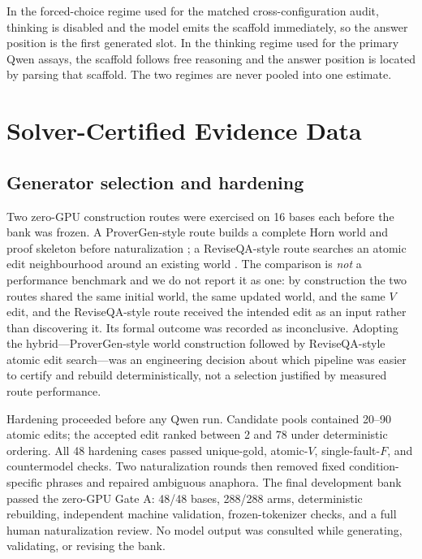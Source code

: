 \documentclass[letterpaper]{article}
\begin{document}
In the forced-choice regime used for the matched cross-configuration audit, thinking is disabled and the model emits the scaffold immediately, so the answer position is the first generated slot. In the thinking regime used for the primary Qwen assays, the scaffold follows free reasoning and the answer position is located by parsing that scaffold. The two regimes are never pooled into one estimate.

\section{Solver-Certified Evidence Data}
\label{supp:data}

\subsection{Generator selection and hardening}

Two zero-GPU construction routes were exercised on 16 bases each before the bank was frozen. A ProverGen-style route builds a complete Horn world and proof skeleton before naturalization \citep{qi2025provergen}; a ReviseQA-style route searches an atomic edit neighbourhood around an existing world \citep{helwe2025reviseqa}. The comparison is \emph{not} a performance benchmark and we do not report it as one: by construction the two routes shared the same initial world, the same updated world, and the same $V$ edit, and the ReviseQA-style route received the intended edit as an input rather than discovering it. Its formal outcome was recorded as inconclusive. Adopting the hybrid---ProverGen-style world construction followed by ReviseQA-style atomic edit search---was an engineering decision about which pipeline was easier to certify and rebuild deterministically, not a selection justified by measured route performance.

Hardening proceeded before any Qwen run.  Candidate pools contained 20--90 atomic edits; the accepted edit ranked between 2 and 78 under deterministic ordering.  All 48 hardening cases passed unique-gold, atomic-$V$, single-fault-$F$, and countermodel checks.  Two naturalization rounds then removed fixed condition-specific phrases and repaired ambiguous anaphora.  The final development bank passed the zero-GPU Gate A: 48/48 bases, 288/288 arms, deterministic rebuilding, independent machine validation, frozen-tokenizer checks, and a full human naturalization review.  No model output was consulted while generating, validating, or revising the bank.
\end{document}
